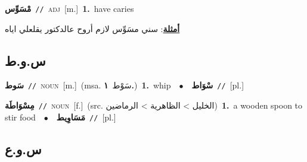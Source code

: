 \documentclass[10pt,a4paper,twoside]{article} %
\begin{document}
\begin{multicols}{2}
{\setlength\topsep{0pt}\textbf{\foreignlanguage{arabic}{مْسَوِّس}}\ {\color{gray}\texttt{//}\color{black}}\ \textsc{adj}\ [m.]\ \textbf{1.}~have caries\  \begin{flushright}\color{gray}\foreignlanguage{arabic}{\textbf{\underline{\foreignlanguage{arabic}{أمثلة}}}: سني مسَوِّس لازم أروح عالدكتور يقلعلي اياه}\end{flushright}\color{black}} \vspace{2mm}

\vspace{-3mm}
\subsection*{\color{blue}\foreignlanguage{arabic}{س.و.ط}\color{blue}{}} 

{\setlength\topsep{0pt}\textbf{\foreignlanguage{arabic}{سَوط}}\ {\color{gray}\texttt{//}\color{black}}\ \textsc{noun}\ [m.]\ \color{gray}(msa. \foreignlanguage{arabic}{سَوْط}~\foreignlanguage{arabic}{\textbf{١.}})\color{black}\ \textbf{1.}~whip\ \ $\bullet$\ \ \setlength\topsep{0pt}\textbf{\foreignlanguage{arabic}{سْوَاط}}\ {\color{gray}\texttt{//}\color{black}}\ [pl.]\ } \vspace{2mm}

{\setlength\topsep{0pt}\textbf{\foreignlanguage{arabic}{مِسْوَاطَة}}\ {\color{gray}\texttt{//}\color{black}}\ \textsc{noun}\ [f.]\ (src. \color{gray}\foreignlanguage{arabic}{الخليل > الظاهرية > الرماضين}\color{black})\ \textbf{1.}~a wooden spoon to stir food\ \ $\bullet$\ \ \setlength\topsep{0pt}\textbf{\foreignlanguage{arabic}{مَسَاوِيط}}\ {\color{gray}\texttt{//}\color{black}}\ [pl.]\ } \vspace{2mm}

\vspace{-3mm}
\subsection*{\color{blue}\foreignlanguage{arabic}{س.و.ع}\color{blue}{}} 


\end{multicols}
\end{document}
